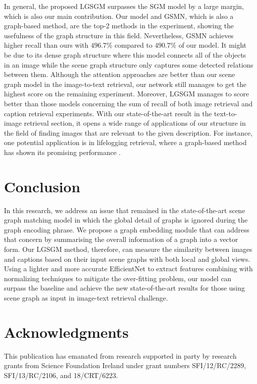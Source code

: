 \documentclass{IOS-Book-Article}
\begin{document}
In general, the proposed LGSGM surpasses the SGM model by a large margin, which is also our main contribution. Our model and GSMN, which is also a graph-based method, are the top-2 methods in the experiment, showing the usefulness of the graph structure in this field. Nevertheless, GSMN achieves higher recall than ours with $496.7\%$ compared to $490.7\%$ of our model. It might be due to its dense graph structure where this model connects all of the objects in an image while the scene graph structure only captures some detected relations between them. Although the attention approaches are better than our scene graph model in the image-to-text retrieval, our network still manages to get the highest score on the remaining experiment. Moreover, LGSGM manages to score better than those models concerning the sum of recall of both image retrieval and caption retrieval experiments. With our state-of-the-art result in the text-to-image retrieval section, it opens a wide range of applications of our structure in the field of finding images that are relevant to the given description. For instance, one potential application is in lifelogging retrieval, where a graph-based method has shown its promising performance \cite{mmm2021graph}.

\section{Conclusion}
In this research, we address an issue that remained in the state-of-the-art scene graph matching model in which the global detail of graphs is ignored during the graph encoding phrase. We propose a graph embedding module that can address that concern by summarising the overall information of a graph into a vector form. Our LGSGM method, therefore, can measure the similarity between images and captions based on their input scene graphs with both local and global views. Using a lighter and more accurate EfficientNet to extract features combining with normalizing techniques to mitigate the over-fitting problem, our model can surpass the baseline and achieve the new state-of-the-art results for those using scene graph as input in image-text retrieval challenge.

\section{Acknowledgments}
This publication has emanated from research supported in party by research grants from Science Foundation Ireland 
under grant numbers SFI/12/RC/2289, SFI/13/RC/2106, and 18/CRT/6223. 



\end{document}
